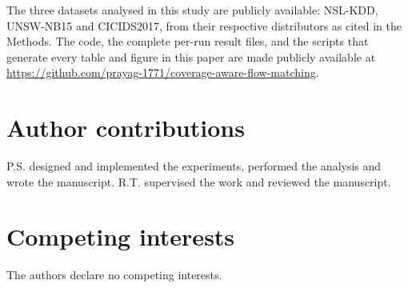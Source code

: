 \documentclass[11pt]{article}
\begin{document}
The three datasets analysed in this study are publicly available: NSL-KDD, UNSW-NB15
and CICIDS2017, from their respective distributors as cited in the Methods. The code,
the complete per-run result files, and the scripts that generate every table and
figure in this paper are made publicly available at
\url{https://github.com/prayag-1771/coverage-aware-flow-matching}.

\section*{Author contributions}

P.S. designed and implemented the experiments, performed the analysis and wrote the
manuscript. R.T. supervised the work and reviewed the manuscript.

\section*{Competing interests}

The authors declare no competing interests.



\end{document}
